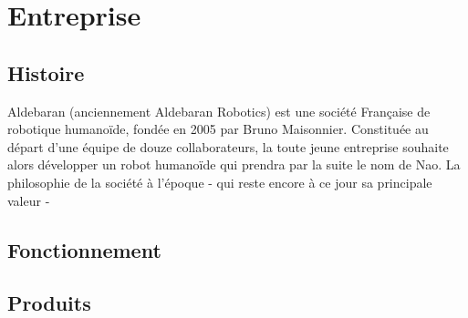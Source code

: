 \chapter*{Entreprise}
\label{Entreprise}
\thispagestyle{fancy}

\section{Histoire}
\label{Entreprise: histoire}
Aldebaran (anciennement Aldebaran Robotics) est une société Française de robotique humanoïde, fondée en 2005 par Bruno Maisonnier. 
Constituée au départ d'une équipe de douze collaborateurs, la toute jeune entreprise souhaite alors développer un robot humanoïde qui prendra par la suite le nom de Nao. La philosophie de la société à l'époque - qui reste encore à ce jour sa principale valeur -

\section{Fonctionnement}

\section{Produits}